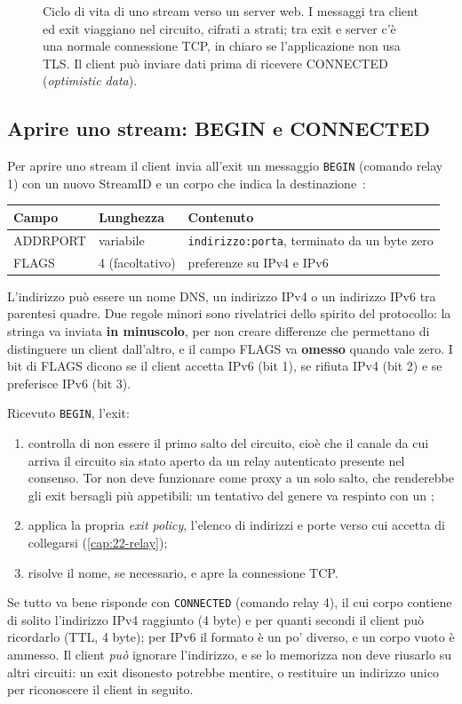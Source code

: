 \begin{figure}[htbp]
\centering

\caption{Ciclo di vita di uno stream verso un server web. I messaggi tra client ed exit viaggiano nel circuito, cifrati a strati; tra exit e server c'è una normale connessione TCP, in chiaro se l'applicazione non usa TLS. Il client può inviare dati prima di ricevere CONNECTED (\emph{optimistic data}).}
\label{fig:stream}
\end{figure}

\subsection{Aprire uno stream: BEGIN e CONNECTED}

Per aprire uno stream il client invia all'exit un messaggio \texttt{BEGIN} (comando relay 1) con un nuovo StreamID e un corpo che indica la destinazione~:
\begin{center}
\begin{tabular}{lll}
\toprule
Campo & Lunghezza & Contenuto \\
\midrule
ADDRPORT & variabile & \texttt{indirizzo:porta}, terminato da un byte zero \\
FLAGS & 4 (facoltativo) & preferenze su IPv4 e IPv6 \\
\bottomrule
\end{tabular}
\end{center}
L'indirizzo può essere un nome DNS, un indirizzo IPv4 o un indirizzo IPv6 tra parentesi quadre. Due regole minori sono rivelatrici dello spirito del protocollo: la stringa va inviata \textbf{in minuscolo}, per non creare differenze che permettano di distinguere un client dall'altro, e il campo FLAGS va \textbf{omesso} quando vale zero. I bit di FLAGS dicono se il client accetta IPv6 (bit 1), se rifiuta IPv4 (bit 2) e se preferisce IPv6 (bit 3).

Ricevuto \texttt{BEGIN}, l'exit:
\begin{enumerate}
  \item controlla di non essere il primo salto del circuito, cioè che il canale da cui arriva il circuito sia stato aperto da un relay autenticato presente nel consenso. Tor non deve funzionare come proxy a un solo salto, che renderebbe gli exit bersagli più appetibili: un tentativo del genere va respinto con un ;
  \item applica la propria \emph{exit policy}, l'elenco di indirizzi e porte verso cui accetta di collegarsi (\cref{cap:22-relay});
  \item risolve il nome, se necessario, e apre la connessione TCP.
\end{enumerate}
Se tutto va bene risponde con \texttt{CONNECTED} (comando relay 4), il cui corpo contiene di solito l'indirizzo IPv4 raggiunto (4 byte) e per quanti secondi il client può ricordarlo (TTL, 4 byte); per IPv6 il formato è un po' diverso, e un corpo vuoto è ammesso. Il client \emph{può} ignorare l'indirizzo, e se lo memorizza non deve riusarlo su altri circuiti: un exit disonesto potrebbe mentire, o restituire un indirizzo unico per riconoscere il client in seguito.

